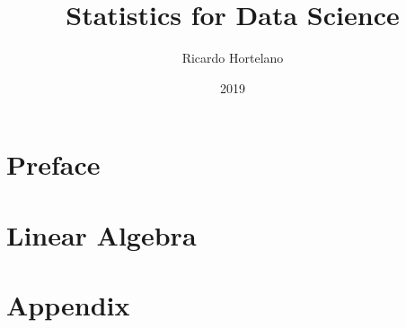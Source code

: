 \documentclass[12pt]{book}
\title{
{Statistics for Data Science}\\
}
\author{Ricardo Hortelano}
\date{2019}
\begin{document}
\maketitle
\tableofcontents

\chapter*{Preface}


\chapter{Linear Algebra}


\appendix
\chapter{Appendix}


\printbibliography
\end{document}
